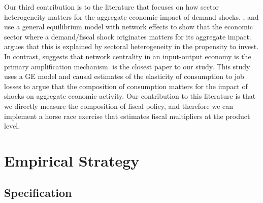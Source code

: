 \documentclass[dv_diss_main.tex]{subfiles}
\begin{document}
Our third contribution is to the literature that focuses on how sector heterogeneity matters for the aggregate economic impact of demand shocks. \cite{vom2022investment}, and \cite{bouakez2020government} use a general equilibrium model with network effects to show that the economic sector where a demand/fiscal shock originates matters for its aggregate impact.\cite{vom2022investment} argues that this is explained by sectoral heterogeneity in the propensity to invest. In contrast, \cite{bouakez2020government} suggests that network centrality in an input-output economy is the primary amplification mechanism. \cite{Alonso2017} is the closest paper to our study. This study uses a GE model and causal estimates of the elasticity of consumption to job losses to argue that the composition of consumption matters for the impact of shocks on aggregate economic activity. Our contribution to this literature is that we directly measure the composition of fiscal policy, and therefore we can implement a horse race exercise that estimates fiscal multipliers at the product level.   







\vspace{0.15in}


\section{Empirical Strategy}
\label{sec:emp_strategy}

\subsection{Specification}
\end{document}
